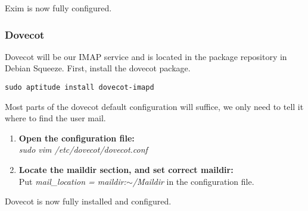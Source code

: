 Exim is now fully configured.

\subsubsection{Dovecot}
Dovecot will be our IMAP service and is located in the package
repository in Debian Squeeze. First, install the dovecot package.
\begin{lstlisting}
sudo aptitude install dovecot-imapd
\end{lstlisting}
Most parts of the dovecot default configuration will suffice, we only
need to tell it where to find the user mail.
\begin{enumerate}
	\item\textbf{Open the configuration file:}\\
 	\emph{sudo vim /etc/dovecot/dovecot.conf}
	\item\textbf{Locate the maildir section, and set correct maildir:}\\
	Put \emph{mail\_location = maildir:$\sim$/Maildir} in the
	configuration file.
\end{enumerate}
Dovecot is now fully installed and configured.


